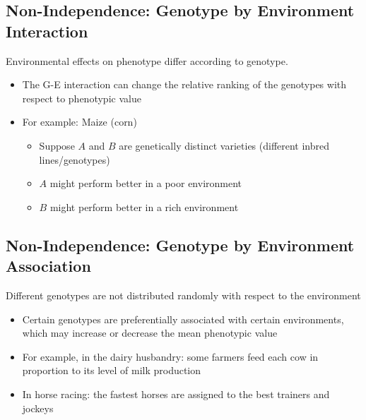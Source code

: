 \documentclass[10pt]{article}
\begin{document}
\subsection*{Non-Independence: Genotype by Environment Interaction}
Environmental effects on phenotype differ according to genotype.
\begin{itemize}
	\item The G-E interaction can change the relative ranking of the genotypes with respect to phenotypic value
	\item For example: Maize (corn)
	\begin{itemize}
	    \item Suppose $A$ and $B$ are genetically distinct varieties (different inbred lines/genotypes)
	    \item $A$ might perform better in a poor environment
	    \item $B$ might perform better in a rich environment
    \end{itemize}
\end{itemize}

\subsection*{Non-Independence: Genotype by Environment Association}
Different genotypes are not distributed randomly with respect to the environment
\begin{itemize}
	\item Certain genotypes are preferentially associated with certain environments, which may increase or decrease the mean phenotypic value
	\item For example, in the dairy husbandry: some farmers feed each cow in proportion to its level of milk production
	\item In horse racing: the fastest horses are assigned to the best trainers and jockeys
\end{itemize}
\end{document}
